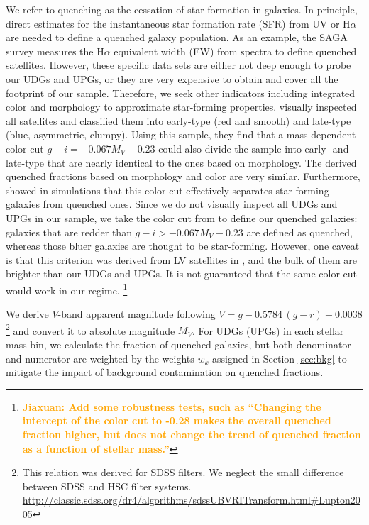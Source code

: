 \documentclass[twocolumn,astrosymb,twocolappendix]{aastex631}
\newcommand{\jiaxuan}[1]{\textcolor{orange}{\textbf{Jiaxuan: #1}}}
\begin{document}
\begin{CJK*}{UTF8}{gbsn}
We refer to quenching as the cessation of star formation in galaxies. In principle, direct estimates for the instantaneous star formation rate (SFR) from UV or H$\alpha$ are needed to define a quenched galaxy  population. As an example, the SAGA survey measures the H$\alpha$ equivalent width (EW) from spectra to define quenched satellites. However, these specific data sets are either not deep enough to probe our UDGs and UPGs, or they are very expensive to obtain and cover all the footprint of our sample. Therefore, we seek other indicators including integrated color and morphology to approximate star-forming properties. \citet{CarlstenELVES2022} visually inspected all satellites and classified them into early-type (red and smooth) and late-type (blue, asymmetric, clumpy). Using this sample, they find that a mass-dependent color cut $g-i = -0.067 M_V - 0.23$ could also divide the sample into early- and late-type that are nearly identical to the ones based on morphology. The derived quenched fractions based on morphology and color are very similar. Furthermore, \citet{Font2022} showed in simulations that this color cut effectively separates star forming galaxies from quenched ones. Since we do not visually inspect all UDGs and UPGs in our sample, we take the color cut from \citet{CarlstenELVES2022} to define our quenched galaxies: galaxies that are redder than $g-i > -0.067 M_V - 0.23$ are defined as quenched, whereas those bluer galaxies are thought to be star-forming. However, one caveat is that this criterion was derived from LV satellites in \citet{CarlstenELVES2022}, and the bulk of them are brighter than our UDGs and UPGs. It is not guaranteed that the same color cut would work in our regime. \footnote{\jiaxuan{Add some robustness tests, such as ``Changing the intercept of the color cut to -0.28 makes the overall quenched fraction higher, but does not change the trend of quenched fraction as a function of stellar mass.''}}

We derive $V$-band apparent magnitude following $V = g - 0.5784\, (g - r) - 0.0038$\footnote{This relation was derived for SDSS filters. We neglect the small difference between SDSS and HSC filter systems. \url{http://classic.sdss.org/dr4/algorithms/sdssUBVRITransform.html\#Lupton2005}} and convert it to absolute magnitude $M_V$. For UDGs (UPGs) in each stellar mass bin, we calculate the fraction of quenched galaxies, but both denominator and numerator are weighted by the weights $w_k$ assigned in Section \ref{sec:bkg} to mitigate the impact of background contamination on quenched fractions. 


\end{CJK*}
\end{document}
